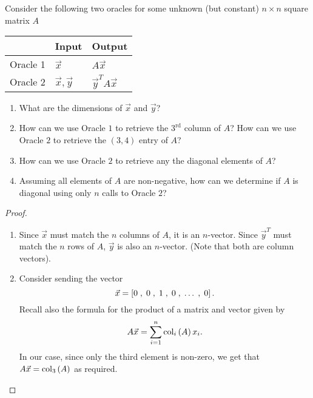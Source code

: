 \documentclass{tutorial}
\begin{document}
\begin{prob}
Consider the following two oracles for some unknown (but constant) $n \times n$ square matrix $A$
\begin{center} \def\arraystretch{1.5} \begin{tabular}{|l|l|l|}
	\hline
	& Input & Output \\
	\hline
	Oracle 1	& $\vec{x}$ 					& $A \vec{x}$ \\
	\hline
	Oracle 2	& $\vec{x}, \vec{y}$	& $\vec{y}^T A \vec{x}$ \\
	\hline
\end{tabular} \end{center}
\begin{enumerate}[label=(\alph*)]
\item What are the dimensions of $\vec{x}$ and $\vec{y}$?
\item How can we use Oracle $1$ to retrieve the $3^{\text{rd}}$ column of $A$? How can we use Oracle $2$ to retrieve the $(3,4)$ entry of $A$?
\item How can we use Oracle $2$ to retrieve any the diagonal elements of $A$?
\item Assuming all elements of $A$ are non-negative, how can we determine if $A$ is diagonal using only $n$ calls to Oracle $2$?
\end{enumerate}
\end{prob} \ifsolns \begin{proof} \mbox{}
\begin{enumerate}[label=(\alph*)]
\item Since $\vec{x}$ must match the $n$ columns of $A$, it is an $n$-vector. Since $\vec{y}^T$ must match the $n$ rows of $A$, $\vec{y}$ is also an $n$-vector. (Note that both are column vectors).
\item Consider sending the vector
\[
	\vec{x} = \ls 0 \; , \; 0 \; , \; 1 \; , \; 0 \; , \; \dots \; , \; 0 \rs .
\]
Recall also the formula for the product of a matrix and vector given by
\[
	A \vec{x} = \sum_{i=1}^n \col{A}{i} x_i .
\]
In our case, since only the third element is non-zero, we get that $A \vec{x} = \col{A}{3}$ as required.


\end{enumerate}
\end{proof}
\end{document}
